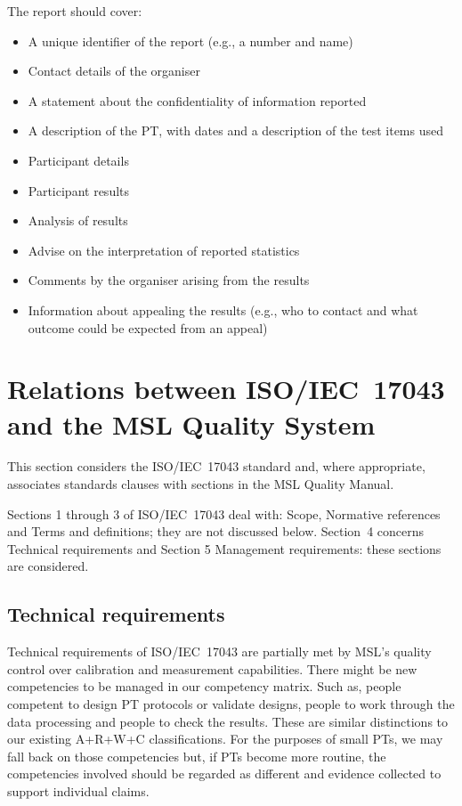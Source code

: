 The report should cover:

\begin{itemize}
	\item A unique identifier of the report (e.g., a number and name) 
	\item Contact details of the organiser
	\item A statement about the confidentiality of information reported
	\item A description of the PT, with dates and a description of the test items used
	\item Participant details
	\item Participant results
	\item Analysis of results
	\item Advise on the interpretation of reported statistics 
	\item Comments by the organiser arising from the results
	\item Information about appealing the results (e.g., who to contact and what outcome could be expected from an appeal)
\end{itemize} 

\section{Relations between ISO/IEC~17043 and the MSL Quality System}
\label{s:ISO_IEC_17043}
This section considers the ISO/IEC~17043 standard and, where appropriate, associates standards clauses with sections in the MSL Quality Manual. 

Sections 1 through 3 of ISO/IEC~17043 deal with: Scope, Normative references and Terms and definitions; they are not discussed below. Section~4 concerns Technical requirements and Section 5 Management requirements: these sections are considered.

\subsection{Technical requirements}

Technical requirements of ISO/IEC~17043 are partially met by MSL's quality control over calibration and measurement capabilities. There might be new competencies to be managed in our competency matrix. Such as, people competent to design PT protocols or validate designs, people to work through the data processing and people to check the results. These are similar distinctions to our existing A+R+W+C classifications. For the purposes of small PTs, we may fall back on those competencies but, if PTs become more routine, the competencies involved should be regarded as different and evidence collected to support individual claims.

